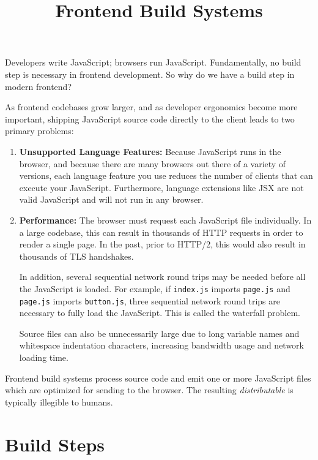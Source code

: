\documentclass{article}
\title{Frontend Build Systems}
\newcommand{\ti}{\textit}
\newcommand{\tb}{\textbf}
\newcommand{\tc}{\texttt}
\begin{document}
\maketitle
\tableofcontents

Developers write JavaScript; browsers run JavaScript. Fundamentally, no build step is necessary in
frontend development. So why do we have a build step in modern frontend?

As frontend codebases grow larger, and as developer ergonomics become more important, shipping
JavaScript source code directly to the client leads to two primary problems:

\begin{enumerate}
  \item \tb{Unsupported Language Features:} Because JavaScript runs in the browser, and because
    there are many browsers out there of a variety of versions, each language feature you use
    reduces the number of clients that can execute your JavaScript. Furthermore, language extensions
    like JSX are not valid JavaScript and will not run in any browser.

  \item \tb{Performance:} The browser must request each JavaScript file individually. In a large
    codebase, this can result in thousands of HTTP requests in order to render a single page. In the
    past, prior to HTTP/2, this would also result in thousands of TLS handshakes.

    In addition, several sequential network round trips may be needed before all the JavaScript is
    loaded. For example, if \tc{index.js} imports \texttt{page.js} and \texttt{page.js} imports
    \tc{button.js}, three sequential network round trips are necessary to fully load the JavaScript.
    This is called the waterfall problem.

    Source files can also be unnecessarily large due to long variable names and whitespace
    indentation characters, increasing bandwidth usage and network loading time.
\end{enumerate}

Frontend build systems process source code and emit one or more JavaScript files which are optimized
for sending to the browser. The resulting \ti{distributable} is typically illegible to humans.

\section{Build Steps}
\end{document}
